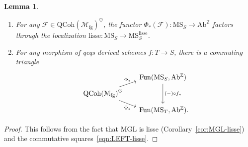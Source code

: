 \documentclass{amsart}
\numberwithin{equation}{section}
\theoremstyle{plain}
\newtheorem{lemma}[equation]{Lemma}
\theoremstyle{definition}
\let\scr=\mathcal
\let\bb=\mathbb
\def\Z{\bb Z}
\def\ph{\mathord-}
\def\QCoh{\mathrm{QCoh}{}}
\def\MGL{\mathrm{MGL}}
\def\MS{\mathrm{MS}}
\def\Ab{\mathrm{A}\mathrm{b}}
\def\Fun{\mathrm{Fun}}
\def\lisse{\mathrm{lisse}}
\let\heart=\heartsuit
\begin{document}
\begin{lemma}\label{lem:LEFT}
	\leavevmode
	\begin{enumerate}
		\item For any $\scr F\in \QCoh(\scr M_\mathrm{fg})^\heart$, the functor $\Phi_*(\scr F)\colon \MS_S\to \Ab^\Z$ factors through the localization $\lisse\colon\MS_S\to\MS_S^\lisse$.
		\item For any morphism of qcqs derived schemes $f\colon T\to S$, there is a commuting triangle
		\[
		\begin{tikzcd}[row sep=5pt,column sep=1.5em]
			 & \Fun(\MS_S,\Ab^\Z) \ar{dd}{(\ph)\circ f_*} \\ 
			\QCoh(\scr M_\mathrm{fg})^\heart \ar[start anchor={[shift={(-10pt,0)}]north east},end anchor={[shift={(0,-5pt)}]west}]{ur}[above=1pt]{\Phi_*} \ar[start anchor={[shift={(-10pt,0)}]south east},end anchor={[shift={(0,5pt)}]west}]{dr}[below=1pt]{\Phi_*} & \\
			& \Fun(\MS_T,\Ab^\Z)\rlap.
		\end{tikzcd}
		\]
	\end{enumerate}
\end{lemma}

\begin{proof}
	This follows from the fact that $\MGL$ is lisse (Corollary~\ref{cor:MGL-lisse}) and the commutative squares~\eqref{eqn:LEFT-lisse}.
\end{proof}
\end{document}
